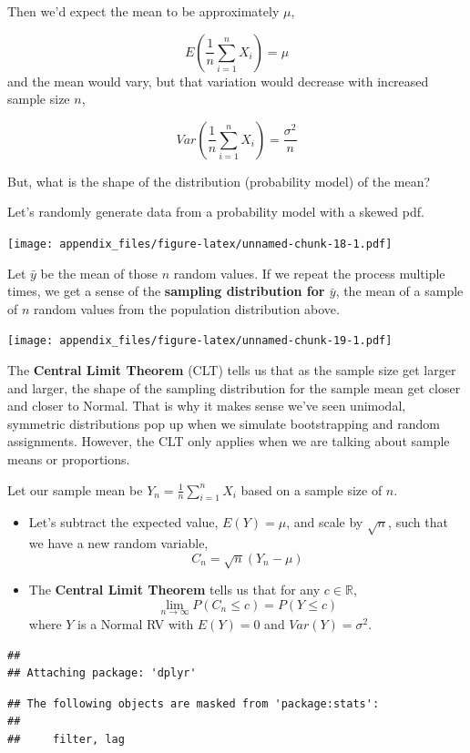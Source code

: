\documentclass[
]{book}
\begin{document}
Then we'd expect the mean to be approximately \(\mu\),

\[E(\frac{1}{n}\sum_{i=1}^n X_i) = \mu\]
and the mean would vary, but that variation would decrease with increased sample size \(n\),

\[Var(\frac{1}{n}\sum_{i=1}^n X_i) = \frac{\sigma^2}{n}\]

But, what is the shape of the distribution (probability model) of the mean?

Let's randomly generate data from a probability model with a skewed pdf.

\texttt{[image: appendix\_files/figure-latex/unnamed-chunk-18-1.pdf]}

Let \(\bar{y}\) be the mean of those \(n\) random values. If we repeat the process multiple times, we get a sense of the \textbf{sampling distribution for \(\bar{y}\)}, the mean of a sample of \(n\) random values from the population distribution above.

\texttt{[image: appendix\_files/figure-latex/unnamed-chunk-19-1.pdf]}

The \textbf{Central Limit Theorem} (CLT) tells us that as the sample size get larger and larger, the shape of the sampling distribution for the sample mean get closer and closer to Normal. That is why it makes sense we've seen unimodal, symmetric distributions pop up when we simulate bootstrapping and random assignments. However, the CLT only applies when we are talking about sample means or proportions.

Let our sample mean be \(Y_n = \frac{1}{n}\sum_{i=1}^n X_i\) based on a sample size of \(n\).

\begin{itemize}
\item
  Let's subtract the expected value, \(E(Y) = \mu\), and scale by \(\sqrt{n}\), such that we have a new random variable,
  \[C_n = \sqrt{n}\left(Y_n - \mu\right) \]
\item
  The \textbf{Central Limit Theorem} tells us that for any \(c \in \mathbb{R}\),
  \[\lim_{n\rightarrow\infty}P(C_n \leq c) = P(Y \leq c)\]
  where \(Y\) is a Normal RV with \(E(Y) = 0\) and \(Var(Y) = \sigma^2\).
\end{itemize}

\begin{verbatim}
## 
## Attaching package: 'dplyr'
\end{verbatim}

\begin{verbatim}
## The following objects are masked from 'package:stats':
## 
##     filter, lag
\end{verbatim}
\end{document}
